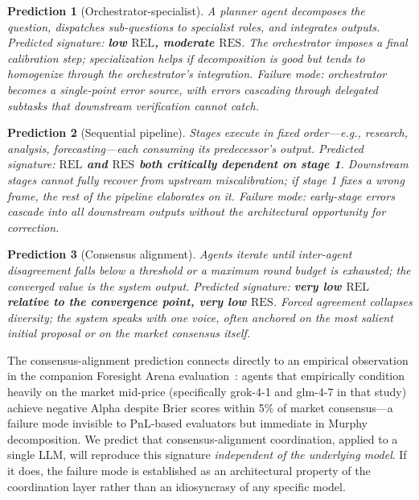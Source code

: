 \documentclass[11pt]{article}
\newtheorem{prediction}{Prediction}
\newcommand{\REL}{\mathrm{REL}}
\newcommand{\RES}{\mathrm{RES}}
\begin{document}
\begin{prediction}[Orchestrator-specialist]
A planner agent decomposes the question, dispatches sub-questions to specialist roles, and integrates outputs. Predicted signature: \textbf{low $\REL$, moderate $\RES$}. The orchestrator imposes a final calibration step; specialization helps if decomposition is good but tends to homogenize through the orchestrator's integration. Failure mode: orchestrator becomes a single-point error source, with errors cascading through delegated subtasks that downstream verification cannot catch.
\end{prediction}

\begin{prediction}[Sequential pipeline]
Stages execute in fixed order---e.g., research, analysis, forecasting---each consuming its predecessor's output. Predicted signature: \textbf{$\REL$ and $\RES$ both critically dependent on stage 1}. Downstream stages cannot fully recover from upstream miscalibration; if stage 1 fixes a wrong frame, the rest of the pipeline elaborates on it. Failure mode: early-stage errors cascade into all downstream outputs without the architectural opportunity for correction.
\end{prediction}

\begin{prediction}[Consensus alignment]
Agents iterate until inter-agent disagreement falls below a threshold or a maximum round budget is exhausted; the converged value is the system output. Predicted signature: \textbf{very low $\REL$ relative to the convergence point, very low $\RES$}. Forced agreement collapses diversity; the system speaks with one voice, often anchored on the most salient initial proposal or on the market consensus itself.
\end{prediction}

The consensus-alignment prediction connects directly to an empirical observation in the companion Foresight Arena evaluation~\citep{nechepurenko2026foresight}: agents that empirically condition heavily on the market mid-price (specifically grok-4-1 and glm-4-7 in that study) achieve negative Alpha despite Brier scores within 5\% of market consensus---a failure mode invisible to PnL-based evaluators but immediate in Murphy decomposition. We predict that consensus-alignment coordination, applied to a single LLM, will reproduce this signature \emph{independent of the underlying model}. If it does, the failure mode is established as an architectural property of the coordination layer rather than an idiosyncrasy of any specific model.
\end{document}
